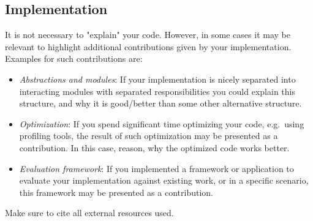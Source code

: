 \subsection{Implementation} It is not necessary to "explain" your code. 
However, in some cases it may be relevant to highlight 
additional contributions given by your implementation.
Examples for such contributions are:
\begin{itemize}
\item \emph{Abstractions and modules}: If your implementation is nicely separated into interacting
modules with separated responsibilities you could explain this structure,
and why it is good/better than some other alternative structure.
\item \emph{Optimization}: If you spend significant time optimizing your code, e.g.~using profiling tools,
the result of such optimization may be presented as a contribution. In this case, reason, 
why the optimized code works better.
\item \emph{Evaluation framework}: If you implemented a framework or application to evaluate your implementation against existing work, or in a specific scenario, this framework may be presented as a contribution.
\end{itemize}

Make sure to cite all external resources used.
